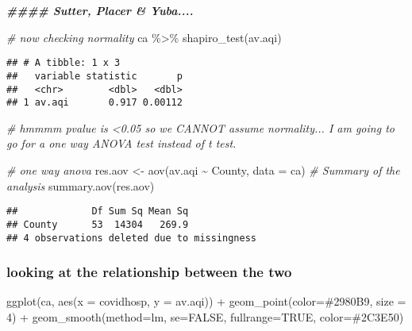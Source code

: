 \documentclass[
]{article}
\newenvironment{Shaded}{\begin{snugshade}}{\end{snugshade}}
\newcommand{\AttributeTok}[1]{\textcolor[rgb]{0.77,0.63,0.00}{#1}}
\newcommand{\CommentTok}[1]{\textcolor[rgb]{0.56,0.35,0.01}{\textit{#1}}}
\newcommand{\ConstantTok}[1]{\textcolor[rgb]{0.00,0.00,0.00}{#1}}
\newcommand{\DecValTok}[1]{\textcolor[rgb]{0.00,0.00,0.81}{#1}}
\newcommand{\DocumentationTok}[1]{\textcolor[rgb]{0.56,0.35,0.01}{\textbf{\textit{#1}}}}
\newcommand{\FunctionTok}[1]{\textcolor[rgb]{0.00,0.00,0.00}{#1}}
\newcommand{\NormalTok}[1]{#1}
\newcommand{\OtherTok}[1]{\textcolor[rgb]{0.56,0.35,0.01}{#1}}
\newcommand{\SpecialCharTok}[1]{\textcolor[rgb]{0.00,0.00,0.00}{#1}}
\newcommand{\StringTok}[1]{\textcolor[rgb]{0.31,0.60,0.02}{#1}}
\begin{document}
\begin{Shaded}
\begin{Highlighting}[]
\DocumentationTok{\#\#\#\# Sutter, Placer \& Yuba....}

\CommentTok{\# now checking normality}
\NormalTok{ca }\SpecialCharTok{\%\textgreater{}\%} \FunctionTok{shapiro\_test}\NormalTok{(av.aqi)}
\end{Highlighting}
\end{Shaded}

\begin{verbatim}
## # A tibble: 1 x 3
##   variable statistic       p
##   <chr>        <dbl>   <dbl>
## 1 av.aqi       0.917 0.00112
\end{verbatim}

\begin{Shaded}
\begin{Highlighting}[]
\CommentTok{\# hmmmm pvalue is \textless{}0.05 so we CANNOT assume normality... I am going to go for a one way ANOVA test instead of t test.}

\CommentTok{\# one way anova}
\NormalTok{res.aov }\OtherTok{\textless{}{-}} \FunctionTok{aov}\NormalTok{(av.aqi }\SpecialCharTok{\textasciitilde{}}\NormalTok{ County, }\AttributeTok{data =}\NormalTok{ ca)}
\CommentTok{\# Summary of the analysis}
\FunctionTok{summary.aov}\NormalTok{(res.aov)}
\end{Highlighting}
\end{Shaded}

\begin{verbatim}
##             Df Sum Sq Mean Sq
## County      53  14304   269.9
## 4 observations deleted due to missingness
\end{verbatim}

\hypertarget{looking-at-the-relationship-between-the-two}{%
\subsubsection{looking at the relationship between the
two}\label{looking-at-the-relationship-between-the-two}}

\begin{Shaded}
\begin{Highlighting}[]
\FunctionTok{ggplot}\NormalTok{(ca, }\FunctionTok{aes}\NormalTok{(}\AttributeTok{x =}\NormalTok{ covidhosp, }\AttributeTok{y =}\NormalTok{ av.aqi)) }\SpecialCharTok{+} 
  \FunctionTok{geom\_point}\NormalTok{(}\AttributeTok{color=}\StringTok{\textquotesingle{}\#2980B9\textquotesingle{}}\NormalTok{, }\AttributeTok{size =} \DecValTok{4}\NormalTok{) }\SpecialCharTok{+} 
  \FunctionTok{geom\_smooth}\NormalTok{(}\AttributeTok{method=}\NormalTok{lm, }\AttributeTok{se=}\ConstantTok{FALSE}\NormalTok{, }\AttributeTok{fullrange=}\ConstantTok{TRUE}\NormalTok{, }\AttributeTok{color=}\StringTok{\textquotesingle{}\#2C3E50\textquotesingle{}}\NormalTok{)}
\end{Highlighting}
\end{Shaded}
\end{document}
